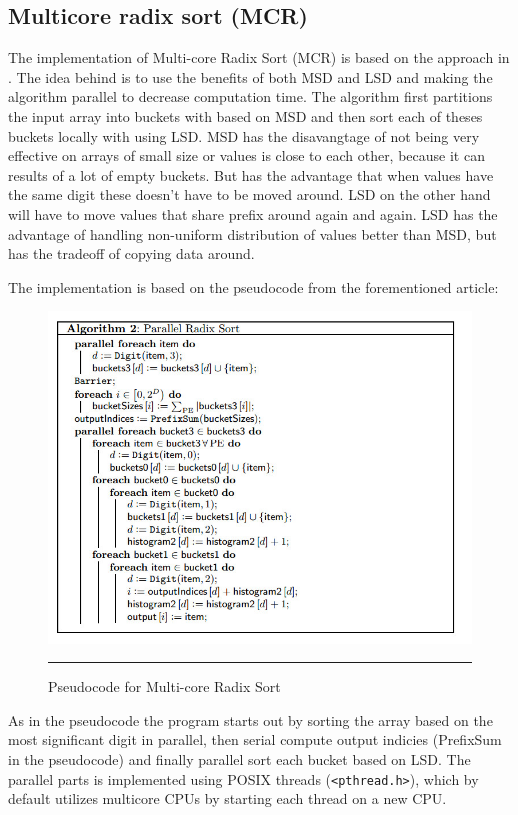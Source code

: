 \subsection{Multicore radix sort (MCR)}
The implementation of Multi-core Radix Sort (MCR) is based on the approach in \citep{radixSort}. The idea behind is to use the benefits of both MSD and LSD and making the algorithm parallel to decrease computation time. 
The algorithm first partitions the input array into buckets with based on MSD and then sort each of theses buckets locally with using LSD.  
MSD has the disavangtage of not being very effective on arrays of small size or values is close to each other, because it can results of a lot of empty buckets. 
But has the advantage that when values have the same digit these doesn't have to be moved around. LSD on the other hand will have to move values that share prefix around again and again.
LSD has the advantage of handling non-uniform distribution of values better than MSD, but has the tradeoff of copying data around.  

The implementation is based on the pseudocode from the forementioned article:
\begin{figure}[htbp]
	\centering
		\includegraphics[width=\textwidth]{./Figures/Project2b/MultiCoreRadix_Pseudo.jpg}
		\rule{35em}{0.5pt}
	\caption[Multicore radix pseudocode]{
	Pseudocode for Multi-core Radix Sort
	}
	\label{fig:Branch_misses}
\end{figure}
As in the pseudocode the program starts out by sorting the array based on the most significant digit in parallel, then serial compute output indicies (PrefixSum in the pseudocode) and finally parallel sort each bucket based on LSD.  
The parallel parts is implemented using POSIX threads (\verb!<pthread.h>!), which by default utilizes multicore CPUs by starting each thread on a new CPU.

